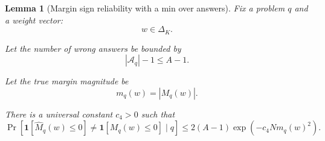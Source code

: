 \documentclass{article} %
\newtheorem{lemma}[theorem]{Lemma}
\providecommand{\Aq}{\mathcal{A}_q}
\providecommand{\simplex}{\Delta_K}
\providecommand{\Mhat}{\widehat{M}}
\begin{document}
\begin{lemma}[Margin sign reliability with a min over answers]
\label{lem:4}
Fix a problem \(q\) and a weight vector:
\begin{equation}
\label{eq:lem4-w}
w\in\simplex .
\end{equation}

Let the number of wrong answers be bounded by
\begin{equation}
\label{eq:lem4-A}
|\Aq|-1
\le
A-1 .
\end{equation}

Let the true margin magnitude be
\begin{equation}
\label{eq:lem4-m}
m_q(w)
=
|M_q(w)| .
\end{equation}

There is a universal constant \(c_4>0\) such that
\begin{equation}
\label{eq:lem4-sign}
\Pr\!\left[
\mathbf 1[\Mhat_q(w)\le 0]\ne \mathbf 1[M_q(w)\le 0]
\mid q
\right]
\le
2(A-1)\exp\!\left(-c_4 N m_q(w)^2\right).
\end{equation}
\end{lemma}
\end{document}

